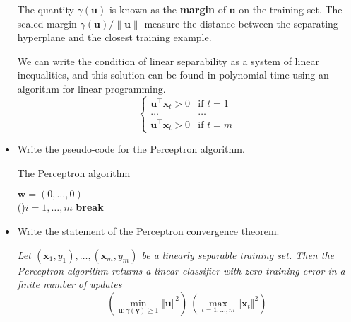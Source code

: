 \begin{itemize}
        The quantity $\gamma(\boldsymbol{u})$ is known as the \textbf{margin} of $\boldsymbol{u}$ on the training set. The scaled margin $\gamma(\boldsymbol{u}) / \lVert\boldsymbol{u}\lVert$ measure the distance between the separating hyperplane and the closest training example.

        We can write the condition of linear separability as a system of linear inequalities, and this solution can be found in polynomial time using an algorithm for linear programming.\\
        $$
        \begin{cases}
            \boldsymbol{u}^{\top}\boldsymbol{x}_t > 0 & \text{if } t = 1\\
            \dots & \dots\\
            \boldsymbol{u}^{\top}\boldsymbol{x}_t > 0 & \text{if } t = m
        \end{cases}
        $$
    
    \item Write the pseudo-code for the Perceptron algorithm.\\

        \begin{algorithm}[H]
            \SetAlgoLined
            \DontPrintSemicolon
            \caption{The Perceptron algorithm}
            $\boldsymbol{w} = (0, \dots, 0)$\\
         {  
            \For(){$i = 1, \dots, m$}{
            }
             {
                \textbf{break}
            } 
           }
        \end{algorithm}

    \item Write the statement of the Perceptron convergence theorem.
    
        \textit{Let $(\boldsymbol{x}_1 , y_1 ), \dots, (\boldsymbol{x}_m , y_m)$ be a linearly separable training set. Then the Perceptron algorithm returns a linear classifier with zero training error in a finite number of updates}
        $$
        \left(\underset{\boldsymbol{u} : \gamma(\boldsymbol{y}) \geq 1}{\min} \Vert \boldsymbol{u} \Vert^2 \right) \ \left( \underset{t = 1, \dots, m}{\max} \Vert \boldsymbol{x}_t \Vert^2 \right)
        $$


\end{itemize}
